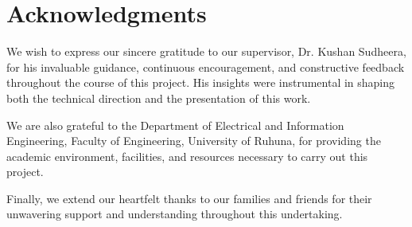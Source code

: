
\chapter*{Acknowledgments}

We wish to express our sincere gratitude to our supervisor, Dr. Kushan Sudheera, for his invaluable guidance, continuous encouragement, and constructive feedback throughout the course of this project. His insights were instrumental in shaping both the technical direction and the presentation of this work.

We are also grateful to the Department of Electrical and Information Engineering, Faculty of Engineering, University of Ruhuna, for providing the academic environment, facilities, and resources necessary to carry out this project.

Finally, we extend our heartfelt thanks to our families and friends for their unwavering support and understanding throughout this undertaking.

